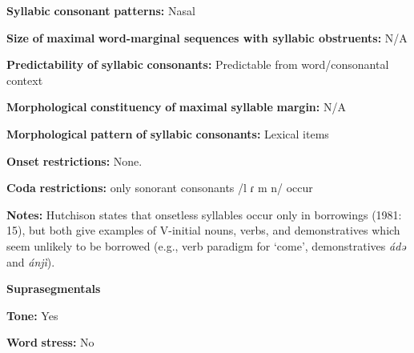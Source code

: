 \documentclass[output=paper]{langsci/langscibook}
\begin{document}
\begin{styleBody}
\textbf{Syllabic} \textbf{consonant} \textbf{patterns:} Nasal
\end{styleBody}

\begin{styleBody}
\textbf{Size} \textbf{of} \textbf{maximal} \textbf{word{}-marginal sequences with syllabic obstruents:} N/A
\end{styleBody}

\begin{styleBody}
\textbf{Predictability} \textbf{of} \textbf{syllabic} \textbf{consonants:} Predictable from word/consonantal context
\end{styleBody}

\begin{styleBody}
\textbf{Morphological} \textbf{constituency} \textbf{of} \textbf{maximal} \textbf{syllable} \textbf{margin:} N/A
\end{styleBody}

\begin{styleBody}
\textbf{Morphological} \textbf{pattern} \textbf{of} \textbf{syllabic} \textbf{consonants:} Lexical items
\end{styleBody}

\begin{styleBody}
\textbf{Onset} \textbf{restrictions:} None.
\end{styleBody}

\begin{styleBody}
\textbf{Coda} \textbf{restrictions:} only sonorant consonants /l ɾ m n/ occur \citep[15]{Hutchison1981}
\end{styleBody}

\begin{styleBody}
\textbf{Notes:} Hutchison states that onsetless syllables occur only in borrowings (1981: 15), but both \citet{HutchisonCyffer1998} give examples of V-initial nouns, verbs, and demonstratives which seem unlikely to be borrowed (e.g., verb paradigm for ‘come’, demonstratives \textit{ádə} and \textit{ánjì}).
\end{styleBody}

\begin{styleBody}
\textbf{Suprasegmentals}
\end{styleBody}

\begin{styleBody}
\textbf{Tone:} Yes
\end{styleBody}

\begin{styleBody}
\textbf{Word} \textbf{stress:} No
\end{styleBody}
\end{document}

